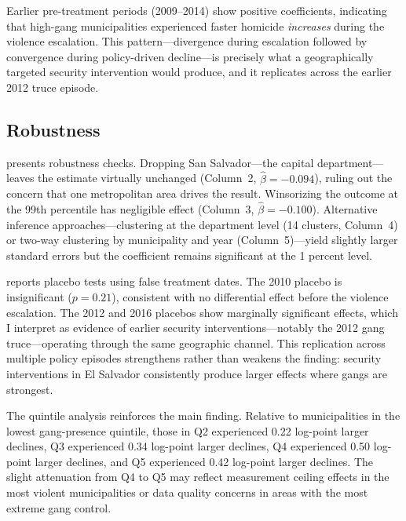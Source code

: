\documentclass[12pt]{article}
\begin{document}
Earlier pre-treatment periods (2009--2014) show positive coefficients, indicating that high-gang municipalities experienced faster homicide \textit{increases} during the violence escalation. This pattern---divergence during escalation followed by convergence during policy-driven decline---is precisely what a geographically targeted security intervention would produce, and it replicates across the earlier 2012 truce episode.

\subsection{Robustness}



 presents robustness checks. Dropping San Salvador---the capital department---leaves the estimate virtually unchanged (Column~2, $\hat{\beta} = -0.094$), ruling out the concern that one metropolitan area drives the result. Winsorizing the outcome at the 99th percentile has negligible effect (Column~3, $\hat{\beta} = -0.100$). Alternative inference approaches---clustering at the department level (14 clusters, Column~4) or two-way clustering by municipality and year (Column~5)---yield slightly larger standard errors but the coefficient remains significant at the 1 percent level.



 reports placebo tests using false treatment dates. The 2010 placebo is insignificant ($p = 0.21$), consistent with no differential effect before the violence escalation. The 2012 and 2016 placebos show marginally significant effects, which I interpret as evidence of earlier security interventions---notably the 2012 gang truce---operating through the same geographic channel. This replication across multiple policy episodes strengthens rather than weakens the finding: security interventions in El Salvador consistently produce larger effects where gangs are strongest.

The quintile analysis reinforces the main finding. Relative to municipalities in the lowest gang-presence quintile, those in Q2 experienced 0.22 log-point larger declines, Q3 experienced 0.34 log-point larger declines, Q4 experienced 0.50 log-point larger declines, and Q5 experienced 0.42 log-point larger declines. The slight attenuation from Q4 to Q5 may reflect measurement ceiling effects in the most violent municipalities or data quality concerns in areas with the most extreme gang control.
\end{document}
